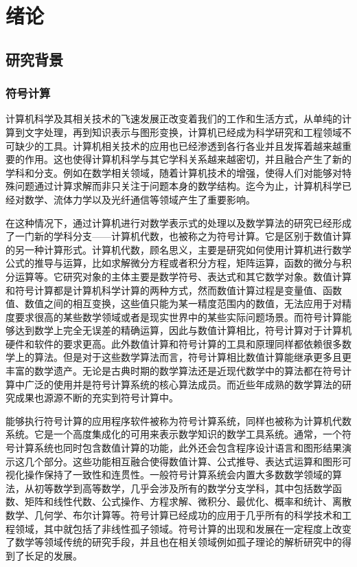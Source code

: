 \chapter{绪论}
\section{研究背景}
\subsection{符号计算}
计算机科学及其相关技术的飞速发展正改变着我们的工作和生活方式，从单纯的计算到文字处理，再到知识表示与图形变换，计算机已经成为科学研究和工程领域不可缺少的工具。计算机相关技术的应用也已经渗透到各行各业并且发挥着越来越重要的作用。这也使得计算机科学与其它学科关系越来越密切，并且融合产生了新的学科和分支。例如在数学相关领域，随着计算机技术的增强，使得人们对能够对特殊问题通过计算求解而非只关注于问题本身的数学结构。迄今为止，计算机科学已经对数学、流体力学以及光纤通信等领域产生了重要影响。

在这种情况下，通过计算机进行对数学表示式的处理以及数学算法的研究已经形成了一门新的学科分支——计算机代数，也被称之为符号计算。它是区别于数值计算的另一种计算形式。计算机代数，顾名思义，主要是研究如何使用计算机进行数学公式的推导与运算，比如求解微分方程或者积分方程，矩阵运算，函数的微分与积分运算等。它研究对象的主体主要是数学符号、表达式和其它数学对象。数值计算和符号计算都是计算机科学计算的两种方式，然而数值计算过程是变量值、函数值、数值之间的相互变换，这些值只能为某一精度范围内的数值，无法应用于对精度要求很高的某些数学领域或者是现实世界中的某些实际问题场景。而符号计算能够达到数学上完全无误差的精确运算，因此与数值计算相比，符号计算对于计算机硬件和软件的要求更高。此外数值计算和符号计算的工具和原理同样都依赖很多数学上的算法。但是对于这些数学算法而言，符号计算相比数值计算能继承更多且更丰富的数学遗产。无论是古典时期的数学算法还是近现代数学中的算法都在符号计算中广泛的使用并是符号计算系统的核心算法成员。而近些年成熟的数学算法的研究成果也源源不断的充实到符号计算中。

能够执行符号计算的应用程序软件被称为符号计算系统，同样也被称为计算机代数系统。它是一个高度集成化的可用来表示数学知识的数学工具系统。通常，一个符号计算系统也同时包含数值计算的功能，此外还会包含程序设计语言和图形结果演示这几个部分。这些功能相互融合使得数值计算、公式推导、表达式运算和图形可视化操作保持了一致性和连贯性。一般符号计算系统会内置大多数数学领域的算法，从初等数学到高等数学，几乎会涉及所有的数学分支学科，其中包括数学函数、矩阵和线性代数、公式操作、方程求解、微积分、最优化、概率和统计、离散数学、几何学、布尔计算等。符号计算已经成功的应用于几乎所有的科学技术和工程领域，其中就包括了非线性孤子领域。符号计算的出现和发展在一定程度上改变了数学等领域传统的研究手段，并且也在相关领域例如孤子理论的解析研究中的得到了长足的发展。

